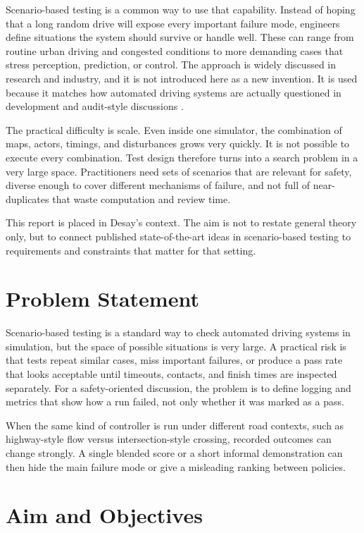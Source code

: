 \documentclass[12pt,a4paper]{report}
\begin{document}
Scenario-based testing is a common way to use that capability. Instead of hoping that a long random drive will expose every important failure mode, engineers define situations the system should survive or handle well. These can range from routine urban driving and congested conditions to more demanding cases that stress perception, prediction, or control. The approach is widely discussed in research and industry, and it is not introduced here as a new invention. It is used because it matches how automated driving systems are actually questioned in development and audit-style discussions \cite{openscenario_standard,pegasus_method}.

The practical difficulty is scale. Even inside one simulator, the combination of maps, actors, timings, and disturbances grows very quickly. It is not possible to execute every combination. Test design therefore turns into a search problem in a very large space. Practitioners need sets of scenarios that are relevant for safety, diverse enough to cover different mechanisms of failure, and not full of near-duplicates that waste computation and review time.

This report is placed in Desay's context. The aim is not to restate general theory only, but to connect published state-of-the-art ideas in scenario-based testing to requirements and constraints that matter for that setting.

\section{Problem Statement}
Scenario-based testing is a standard way to check automated driving systems in simulation, but the space of possible situations is very large. A practical risk is that tests repeat similar cases, miss important failures, or produce a pass rate that looks acceptable until timeouts, contacts, and finish times are inspected separately. For a safety-oriented discussion, the problem is to define logging and metrics that show how a run failed, not only whether it was marked as a pass.

When the same kind of controller is run under different road contexts, such as highway-style flow versus intersection-style crossing, recorded outcomes can change strongly. A single blended score or a short informal demonstration can then hide the main failure mode or give a misleading ranking between policies.

\section{Aim and Objectives}
\end{document}
